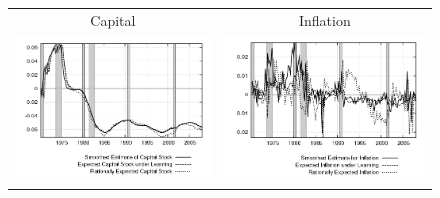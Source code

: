\begin{figure}
\begin{tabular}{cc}
Capital & Inflation \\
\includegraphics[scale=0.52]{results_reinit/capital_exp.png} & 
\includegraphics[scale=0.52]{results_reinit/inflation_exp.png} \\ \\ 
 
\end{tabular}
\end{figure}
